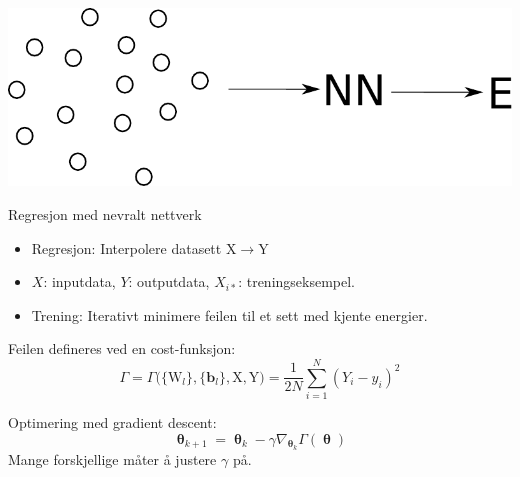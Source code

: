 \documentclass{beamer}
\begin{document}
\begin{frame}
 
\centering
\includegraphics[width=0.9\linewidth]{../Figures/Presentation/interpolation.pdf}
\begin{block}{Regresjon med nevralt nettverk}
 \begin{itemize}
  \item Regresjon: Interpolere datasett $\mathrm{X} \rightarrow \mathrm{Y}$
  \item $X$: inputdata, $Y$: outputdata, $X_{i*}$: treningseksempel. 
  \item Trening: Iterativt minimere feilen til et sett med kjente energier. 
 \end{itemize}
\end{block}

\end{frame}


\begin{frame}
 
\begin{block}{Feilen defineres ved en cost-funksjon:} 
 \begin{equation*}
 \Gamma = \Gamma\bigr(\{\mathrm{W}_l\}, \{\mathbf{b}_l\}, \mathrm{X}, \mathrm{Y}\bigr)
        = \frac{1}{2N}\sum_{i=1}^N (Y_i - y_i)^2
 \end{equation*}
\end{block}

\begin{block}{Optimering med gradient descent:}
 \begin{equation*}
  \mathbf{\uptheta}_{k+1} = \mathbf{\uptheta}_{k} - \gamma \nabla_{\mathbf{\uptheta}_k} \Gamma(\mathbf{\uptheta})
 \end{equation*}
 Mange forskjellige måter å justere $\gamma$ på. 
\end{block}

\end{frame}
\end{document}
